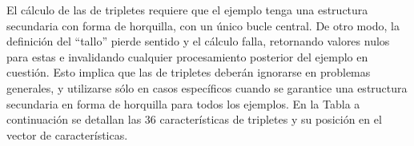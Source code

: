 %
%
El cálculo de las  de tripletes requiere que el ejemplo
tenga una estructura secundaria con forma de horquilla, con un único
bucle central.
De otro modo, la definición del ``tallo'' pierde sentido y el
cálculo falla, retornando valores nulos para estas  e
invalidando cualquier procesamiento posterior del ejemplo en cuestión.
Esto implica que las  de tripletes deberán ignorarse en
problemas generales, y utilizarse sólo en casos específicos cuando se
garantice una estructura secundaria en forma de horquilla para todos
los ejemplos.
En la Tabla a continuación se detallan las $36$ características de
tripletes \cite{xue} y su posición en el vector de características.
